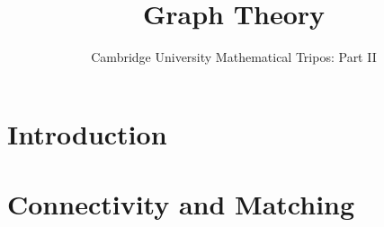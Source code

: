 \documentclass{article}
\title{Graph Theory}
\author{Cambridge University Mathematical Tripos: Part II}
\begin{document}
\maketitle

\tableofcontentsnewpage{}

\section{Introduction}

\section{Connectivity and Matching}

\end{document}

